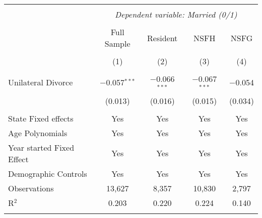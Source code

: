 
\begingroup 
\footnotesize 
\begin{tabular}{@{\extracolsep{5pt}}lcccc} 
\\[-1.8ex]\hline 
\hline \\[-1.8ex] 
 & \multicolumn{4}{c}{\textit{Dependent variable: Married (0/1)}} \\ 
\cline{2-5} 
\\[-1.0ex]
 & Full Sample & Resident & NSFH & NSFG \\ 
\\[-1.8ex] & (1) & (2) & (3) & (4)\\ 
\hline \\[-1.8ex] 
 Unilateral Divorce & $-$0.057$^{***}$ & $-$0.066$^{***}$ & $-$0.067$^{***}$ & $-$0.054 \\ 
  & (0.013) & (0.016) & (0.015) & (0.034) \\ 
 \hline \\[-1.8ex] 
State Fixed effects & Yes & Yes & Yes & Yes \\ 
Age Polynomials & Yes & Yes & Yes & Yes \\ 
Year started Fixed Effect & Yes & Yes & Yes & Yes \\ 
Demographic Controls & Yes & Yes & Yes & Yes \\ 
Observations & 13,627 & 8,357 & 10,830 & 2,797 \\ 
R$^{2}$ & 0.203 & 0.220 & 0.224 & 0.140 \\ 
\hline 
\hline \\[-1.8ex] 
\end{tabular} 
\endgroup 
